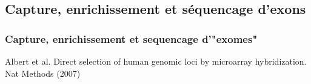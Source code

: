 \documentclass{beamer}
\begin{document}
\subsection{Capture, enrichissement et séquencage d'exons} %
\label{sub:subsection_name}



\begin{frame}
	\frametitle{Capture, enrichissement et sequencage d'"exomes"}
		\tiny{Albert et al. Direct selection of human genomic loci by microarray hybridization. Nat Methods (2007)}
\end{frame}



\end{document}
